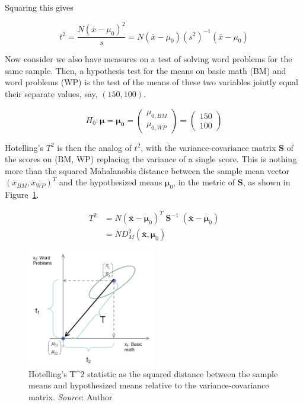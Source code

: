 \documentclass[
  letterpaper,
  10pt,
  krantz2]{krantz}
\begin{document}
Squaring this gives

\[
t^2 = \frac{N (\bar{x} - \mu_0)^2}{s} = N (\bar{x} - \mu_0)(s^2)^{-1} (\bar{x} - \mu_0)
\]

Now consider we also have measures on a test of solving word problems
for the same sample. Then, a hypothesis test for the means on basic math
(BM) and word problems (WP) is the test of the means of these two
variables jointly equal their separate values, say, \((150, 100)\).

\[
H_0 : \mathbf{\mu} = \mathbf{\mu_0} =
  \begin{pmatrix}
    \mu_{0,BM} \\ \mu_{0,WP}
  \end{pmatrix}
  =
  \begin{pmatrix}
    150 \\ 100
  \end{pmatrix}
\]

Hotelling's \(T^2\) is then the analog of \(t^2\), with the
variance-covariance matrix \(\mathbf{S}\) of the scores on (BM, WP)
replacing the variance of a single score. This is nothing more than the
squared Mahalanobis distance between the sample mean vector
\((\bar{x}_{BM}, \bar{x}_{WP})^T\) and the hypothesized means
\(\mathbf{\mu}_0\), in the metric of \(\mathbf{S}\), as shown in
Figure~\ref{fig-T2-diagram}.

\begin{align*}
T^2 &= N (\bar{\mathbf{x}} - \mathbf{\mu}_0)^T \; \mathbf{S}^{-1} \; (\bar{\mathbf{x}} - \mathbf{\mu}_0) \\
    &= N D^2_M (\bar{\mathbf{x}}, \mathbf{\mu}_0)
\end{align*}

\begin{figure}

{\centering \includegraphics[width=0.5\textwidth,height=\textheight]{images/T2-diagram.png}

}

\caption{\label{fig-T2-diagram}Hotelling's T\^{}2 statistic as the
squared distance between the sample means and hypothesized means
relative to the variance-covariance matrix. \emph{Source}: Author}

\end{figure}
\end{document}
